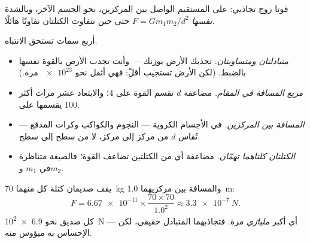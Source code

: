 \begin{omfigure}

{\small قوتا زوج تجاذبي: على المستقيم الواصل بين
المركزين، نحو الجسم الآخر، وبالشدة \emph{نفسها}
$F = G m_1 m_2 / d^2$ حتى حين تتفاوت الكتلتان تفاوتًا هائلًا.}
\end{omfigure}

\begin{remark}\label{rem:g10:universal-gravitation:reading}
أربع سمات تستحق الانتباه.
\begin{itemize}
  \item \emph{متبادلتان ومتساويتان.} تجذبك الأرض بوزنك
        --- وأنت تجذب الأرض بالقوة نفسها بالضبط. (لكن
        الأرض تستجيب أقلّ: فهي أثقل نحو $\num{e23}$
        مرة.)
  \item \emph{مربع المسافة في المقام.} مضاعفة $d$ تقسم القوة على $4$؛
        والابتعاد عشر مرات أكثر يقسمها على $100$.
  \item \emph{المسافة بين المركزين.} في الأجسام الكروية --- النجوم
        والكواكب وكرات المدفع --- تُقاس $d$ من مركز إلى مركز، لا
        من سطح إلى سطح.
  \item \emph{الكتلتان كلتاهما تهمّان.} مضاعفة أي من الكتلتين تضاعف
        القوة؛ فالصيغة متناظرة في $m_1$ و$m_2$.
\end{itemize}
\end{remark}

\begin{example}[صديقان]\label{ex:g10:universal-gravitation:friends}
يقف صديقان كتلة كل منهما \qty{70}{kg} والمسافة بين مركزيهما \qty{1.0}{m}:
\[
F = \num{6.67e-11} \times \frac{70 \times 70}{1.0^2}
\approx \qty{3.3e-7}{N}.
\]
 كل صديق نحو \qty{6.9e2}{N} --- أي أكبر \emph{مليارَي}
مرة. فتجاذبهما المتبادل حقيقي، لكن الإحساس به ميؤوس منه.
\end{example}

